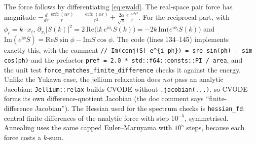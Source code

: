 The force follows by differentiating \eqref{eq:ewald}. The real-space pair force has magnitude
$-\frac{d}{dr}\frac{\operatorname{erfc}(\alpha r)}r=\frac{\operatorname{erfc}(\alpha r)}{r^2}+\frac{2\alpha}{\sqrt\pi}\frac{e^{-\alpha^2r^2}}{r}$.
For the reciprocal part, with $\phi_i=k\cdot x_i$,
$\partial_{x_i}|S(k)|^2=2\,\mathrm{Re}\bigl(\mathrm ik\,e^{\mathrm i\phi_i}\overline{S(k)}\bigr)=-2k\,\mathrm{Im}\bigl(e^{\mathrm i\phi_i}\overline{S(k)}\bigr)$
and $\mathrm{Im}(e^{\mathrm i\phi}\overline S)=\mathrm{Re}S\sin\phi-\mathrm{Im}S\cos\phi$. The code (lines 134--145)
implements exactly this, with the comment \texttt{// Im(conj(S) e\^{}\{i ph\}) = sre sin(ph) - sim cos(ph)} and the
prefactor \texttt{pref = 2.0 * std::f64::consts::PI / area}, and the unit test
\texttt{force\_\allowbreak matches\_\allowbreak finite\_\allowbreak difference} checks it against the energy.
Unlike the Yukawa case, the jellium relaxation does \emph{not} pass an analytic Jacobian: \texttt{Jellium::relax} builds
CVODE without \texttt{.jacobian(...)}, so CVODE forms its own difference-quotient Jacobian (the doc comment says
``finite-difference Jacobian''). The Hessian used for the spectrum checks is \texttt{hessian\_fd}: central finite
differences of the analytic force with step $10^{-5}$, symmetrised. Annealing uses the same capped Euler--Maruyama with
$10^5$ steps, because each force costs a $k$-sum.


